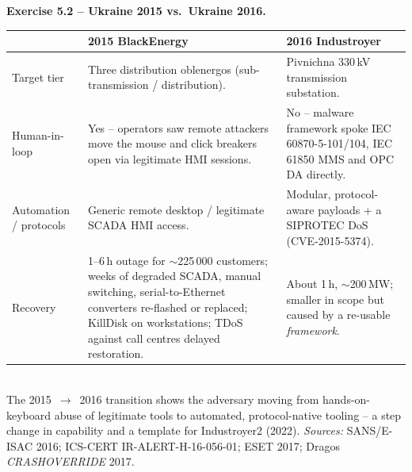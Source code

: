 \documentclass[11pt,a4paper]{article}
\begin{document}
\begin{solutionbox}
\textbf{Exercise 5.2 -- Ukraine 2015 vs.\ Ukraine 2016.}
\begin{tabular}{p{2.6cm} p{5.7cm} p{5.7cm}}
\toprule
& \textbf{2015 BlackEnergy} & \textbf{2016 Industroyer} \\
\midrule
Target tier & Three distribution oblenergos (sub-transmission / distribution). &
              Pivnichna 330\,kV transmission substation. \\
Human-in-loop & Yes -- operators saw remote attackers move the mouse and click breakers
              open via legitimate HMI sessions. &
              No -- malware framework spoke IEC 60870-5-101/104, IEC 61850 MMS and OPC DA
              directly. \\
Automation / protocols & Generic remote desktop / legitimate SCADA HMI access. &
              Modular, protocol-aware payloads + a SIPROTEC DoS (CVE-2015-5374). \\
Recovery & 1--6\,h outage for $\sim$225\,000 customers; weeks of degraded SCADA, manual
              switching, serial-to-Ethernet converters re-flashed or replaced; KillDisk on
              workstations; TDoS against call centres delayed restoration. &
              About 1\,h, $\sim$200\,MW; smaller in scope but caused by a re-usable
              \emph{framework}. \\
\bottomrule
\end{tabular}\\[2pt]
The 2015~$\to$~2016 transition shows the adversary moving from hands-on-keyboard abuse of
legitimate tools to automated, protocol-native tooling -- a step change in capability and a
template for Industroyer2 (2022). \emph{Sources:} SANS/E-ISAC 2016; ICS-CERT IR-ALERT-H-16-056-01; ESET 2017; Dragos \emph{CRASHOVERRIDE} 2017.
\end{solutionbox}
\end{document}
